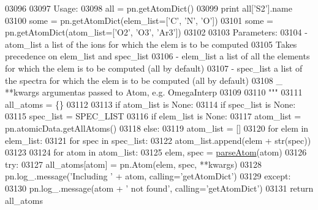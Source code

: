\begin{DoxyCode}
{{{{{{{{{{{{{{{{{{{{{{03096 \textcolor{stringliteral}{}
03097 \textcolor{stringliteral}{    Usage:}
03098 \textcolor{stringliteral}{        all = pn.getAtomDict()}
03099 \textcolor{stringliteral}{        print all['S2'].name}
03100 \textcolor{stringliteral}{        some = pn.getAtomDict(elem\_list=['C', 'N', 'O'])}
03101 \textcolor{stringliteral}{        some = pn.getAtomDict(atom\_list=['O2', 'O3', 'Ar3'])}
03102 \textcolor{stringliteral}{    }
03103 \textcolor{stringliteral}{    Parameters:}
03104 \textcolor{stringliteral}{        - atom\_list     a list of the ions for which the elem is to be computed }
03105 \textcolor{stringliteral}{                        Takes precedence on elem\_list and spec\_list}
03106 \textcolor{stringliteral}{        - elem\_list     a list of all the elements for which the elem is to be computed (all by default)}
03107 \textcolor{stringliteral}{        - spec\_list     a list of the spectra for which the elem is to be computed (all by default)}
03108 \textcolor{stringliteral}{        \_ **kwargs      argumentas passed to Atom, e.g. OmegaInterp}
03109 \textcolor{stringliteral}{}
03110 \textcolor{stringliteral}{    """} 
03111     all\_atoms = \{\}
03112 
03113     \textcolor{keywordflow}{if} atom\_list \textcolor{keywordflow}{is} \textcolor{keywordtype}{None}:       
03114         \textcolor{keywordflow}{if} spec\_list \textcolor{keywordflow}{is} \textcolor{keywordtype}{None}:
03115             spec\_list = SPEC\_LIST
03116         \textcolor{keywordflow}{if} elem\_list \textcolor{keywordflow}{is} \textcolor{keywordtype}{None}:
03117             atom\_list = pn.atomicData.getAllAtoms()
03118         \textcolor{keywordflow}{else}:
03119             atom\_list = []
03120             \textcolor{keywordflow}{for} elem \textcolor{keywordflow}{in} elem\_list:
03121                 \textcolor{keywordflow}{for} spec \textcolor{keywordflow}{in} spec\_list:
03122                     atom\_list.append(elem + str(spec)) 
03123 
03124     \textcolor{keywordflow}{for} atom \textcolor{keywordflow}{in} atom\_list:
03125         elem, spec = \hyperlink{namespacepyneb_1_1utils_1_1misc_a8c069186002a3e73dd474958e35034d5}{parseAtom}(atom)        
03126         \textcolor{keywordflow}{try}:
03127             all\_atoms[atom] = pn.Atom(elem, spec, **kwargs)
03128             pn.log\_.message(\textcolor{stringliteral}{'Including '} + atom, calling=\textcolor{stringliteral}{'getAtomDict'})
03129         \textcolor{keywordflow}{except}:
03130             pn.log\_.message(atom + \textcolor{stringliteral}{' not found'}, calling=\textcolor{stringliteral}{'getAtomDict'})
03131     \textcolor{keywordflow}{return} all\_atoms
}}}}}}}}}}}}}}}}}}}}}}
\end{DoxyCode}
